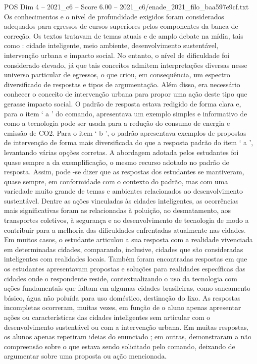 \begin{textsample}{POS Dim 4 – 2021\_c6 – Score 6.00 – 2021\_c6/enade\_2021\_filo\_baa597e9cf.txt}
Os conhecimentos e o nível de profundidade exigidos foram considerados adequados para egressos de cursos superiores pelos componentes da banca de correção.
Os textos tratavam de temas atuais e de amplo debate na mídia, tais como : cidade inteligente, meio ambiente, desenvolvimento sustentável, intervenção urbana e impacto social.
No entanto, o nível de dificuldade foi considerado elevado, já que tais conceitos admitem interpretações diversas nesse universo particular de egressos, o que criou, em consequência, um espectro diversificado de respostas e tipos de argumentação.
Além disso, era necessário conhecer o conceito de intervenção urbana para propor uma ação deste tipo que gerasse impacto social.
O padrão de resposta estava redigido de forma clara e, para o item ‘ a ’ do comando, apresentava um exemplo simples e informativo de como a tecnologia pode ser usada para a redução do consumo de energia e emissão de CO2.
Para o item ‘ b ’, o padrão apresentava exemplos de propostas de intervenção de forma mais diversificada do que a resposta padrão do item ‘ a ’, levantando várias opções corretas.
A abordagem adotada pelos estudantes foi quase sempre a da exemplificação, o mesmo recurso adotado no padrão de resposta.
Assim, pode -se dizer que as respostas dos estudantes se mantiveram, quase sempre, em conformidade com o contexto do padrão, mas com uma variedade muito grande de temas e ambientes relacionados ao desenvolvimento sustentável.
Dentre as ações vinculadas às cidades inteligentes, as ocorrências mais significativas foram as relacionadas à poluição, ao desmatamento, aos transportes coletivos, à segurança e ao desenvolvimento de tecnologia de modo a contribuir para a melhoria das dificuldades enfrentadas atualmente nas cidades.
Em muitos casos, o estudante articulou a sua resposta com a realidade vivenciada em determinadas cidades, comparando, inclusive, cidades que são consideradas inteligentes com realidades locais.
Também foram encontradas respostas em que os estudantes apresentavam propostas e soluções para realidades específicas das cidades onde o respondente reside, contextualizando o uso da tecnologia com ações fundamentais que faltam em algumas cidades brasileiras, como saneamento básico, água não poluída para uso doméstico, destinação do lixo.
As respostas incompletas ocorreram, muitas vezes, em função de o aluno apenas apresentar ações ou características das cidades inteligentes sem articular com o desenvolvimento sustentável ou com a intervenção urbana.
Em muitas respostas, os alunos apenas repetiram ideias do enunciado ; em outras, demonstraram a não compreensão sobre o que estava sendo solicitado pelo comando, deixando de argumentar sobre uma proposta ou ação mencionada.

\end{textsample}
